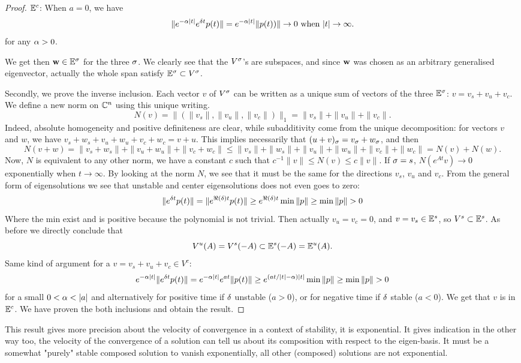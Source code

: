 \begin{proof}
$\mathbb{E}^c$: When $a=0$, we have
$$\|e^{-\alpha |t|}e^{\delta t}p(t)\|
= e^{-\alpha |t|}\|p(t))\| \to0 \text{ when }|t|\to\infty.$$
for any $\alpha>0$. 

We get then $\mathbf{w} \in \mathbb{E}^\sigma$ for the three $\sigma$. We clearly see that the $V^\sigma$'s are subspaces, and since $\mathbf{w}$ was chosen as an arbitrary generalised eigenvector, actually the whole span satisfy $\mathbb{E}^\sigma\subset V^\sigma$.

Secondly, we prove the inverse inclusion.
Each vector $v$ of $V^\sigma$ can be written as a unique sum of vectors of the three $\mathbb{E}^\sigma$: $v = v_s + v_u + v_c$. We define a new norm on $\mathbb{C}^n$ using this unique writing. 
$$N(v)= \big\|(\|v_s\|,\|v_u\|,\|v_c\|)\big\|_1 = \|v_s\|+\|v_u\|+\|v_c\|.$$ Indeed, absolute homogeneity and positive definiteness are clear, while subadditivity come from the unique decomposition: for vectors $v$ and $w$, we have $v_s+w_s + v_u+w_u + v_c+w_c=v+u$. This implies necessarily that $(u+v)_\sigma=v_\sigma + w_\sigma$, and then
$$N(v+w) = \|v_s+w_s\|+\|v_u+w_u\|+\|v_c+w_c\| \leq \|v_s\|+\|w_s\|+\|v_u\|+\|w_u\|+\|v_c\|+ \|w_c\|= N(v)+N(w).$$
Now, $N$ is equivalent to any other norm, \ie we have a constant $c$ such that $c^{-1}\|v\|\leq N(v)\leq c\|v\|$.
If $\sigma=s$, $N(e^{At}v)\to0$ exponentially when $t\to\infty$. By looking at the norm $N$, we see that it must be the same for the directions $v_s$, $v_u$ and $v_c$. From the general form of eigensolutions we see that unstable and center eigensolutions does not even goes to zero: 
$$\|e^{\d t}p(t)\|
=\|e^{\Re(\d)t}p(t)\|
\geq e^{\Re(\d)t}\min\|p\|\geq \min\|p\|>0$$
Where the min exist and is positive because the polynomial is not trivial. Then actually $v_u=v_c=0$, and $v = v_s\in \mathbb{E}^s$, so $V^s\subset \mathbb{E}^s$. As before we directly conclude that $$V^u(A)=V^s(-A)\subset \mathbb{E}^s(-A)=\mathbb{E}^u(A).$$ Same kind of argument for a $v=v_s+v_u+v_c\in V^c$: 
$$e^{-\a|t|}\|e^{\d t}p(t)\|
=e^{-\a|t|}e^{at}\|p(t)\|
\geq e^{(at/|t|-\a)|t|}\min\|p\|\geq \min\|p\|>0$$
for a small $0<\a<|a|$ and alternatively for positive time if $\delta$ unstable ($a>0$), or for negative time if $\delta$ stable ($a<0$). We get that $v$ is in $\mathbb{E}^c$.
We have proven the both inclusions and obtain the result.
\end{proof}
This result gives more precision about the velocity of convergence in a context of stability, it is exponential. It gives indication in the other way too, the velocity of the convergence of a solution can tell us about its composition with respect to the eigen-basis. It must be a somewhat "purely" stable composed solution to vanish exponentially, all other (composed) solutions are not exponential.

